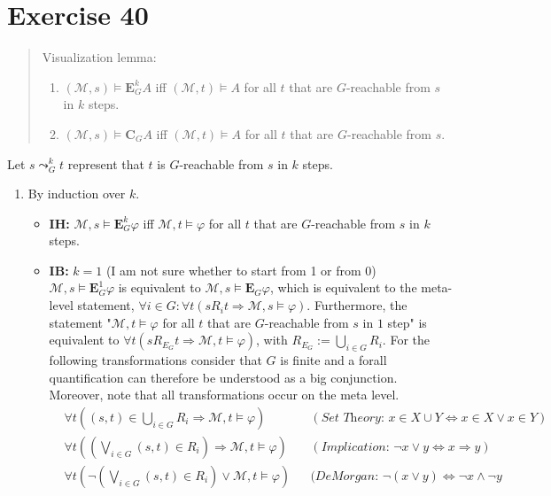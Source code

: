 \documentclass[11pt,a4paper]{article}
\newcommand{\egen}{\mathbf{E}}
\newcommand{\ecom}{\mathbf{C}}
\newcommand{\sto}{\Rightarrow}
\begin{document}
\section*{Exercise 40}
\begin{quote}
Visualization lemma:
\begin{enumerate}
\item $(\mathcal{M},s) \models \egen_G^k A$ iff $(\mathcal{M},t) \models A$ for all $t$ that are $G$-reachable from $s$ in $k$ steps.
\item $(\mathcal{M},s) \models \ecom_G A$ iff $(\mathcal{M},t) \models A$ for all $t$ that are $G$-reachable from $s$.
\end{enumerate}
\end{quote}
Let $s \leadsto_G^k t$ represent that $t$ is $G$-reachable from $s$ in $k$ steps.
\begin{enumerate}
\item By induction over $k$.
\begin{itemize}
\item \textbf{IH:} $\mathcal{M},s \models \egen_G^k \varphi$ iff $\mathcal{M},t \models \varphi$ for all $t$ that are $G$-reachable from $s$ in $k$ steps.
\item \textbf{IB:} $k=1$ (I am not sure whether to start from 1 or from 0) \\
$\mathcal{M},s \models \egen_G^1 \varphi$ is equivalent to $\mathcal{M},s \models \egen_G \varphi$, which is equivalent to the meta-level statement, $\forall i \in G : \forall t (sR_it \sto \mathcal{M}, s \models \varphi)$. 
Furthermore, the statement "$\mathcal{M},t \models \varphi$ for all $t$ that are $G$-reachable from $s$ in $1$ step" is equivalent to $\forall t (s R_{E_G} t \sto \mathcal{M},t \models \varphi)$, with $R_{E_G}:= \bigcup_{i \in G} R_i$. For the following transformations consider that $G$ is finite and a forall quantification can therefore be understood as a big conjunction. Moreover, note that all transformations occur on the meta level.
\begin{align*}
& \forall t ((s,t) \in \bigcup_{i \in G} R_i \sto \mathcal{M},t \models \varphi) && (\textit{Set Theory: } x \in X \cup Y \Leftrightarrow x \in X \lor x \in Y)& \\
& \forall t ((\bigvee_{i \in G} (s,t) \in R_i) \sto \mathcal{M},t \models \varphi) && (\textit{Implication: } \neg x \lor y \Leftrightarrow x \sto y)& \\
& \forall t (\neg (\bigvee_{i \in G} (s,t) \in R_i) \lor \mathcal{M},t \models \varphi) && (\textit{DeMorgan: } \neg (x \lor y) \Leftrightarrow \neg x \land \neg y& \\

\end{align*}
\end{itemize}
\end{enumerate}
\end{document}
